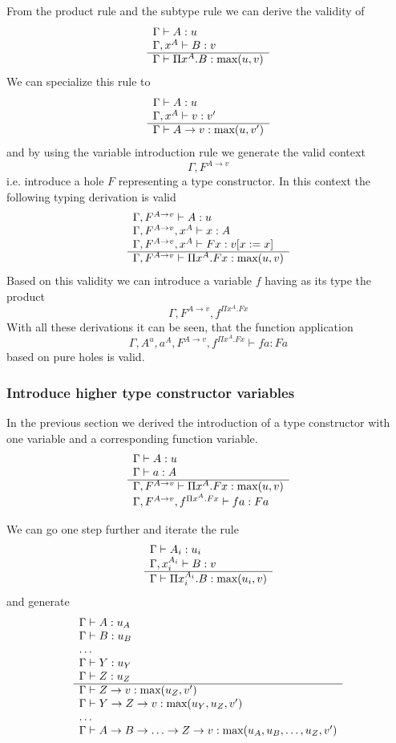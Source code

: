 From the product rule and the subtype rule we can derive the validity of
%
$$
\begin{array}{l} 
    \Gamma \vdash A: u
    \\
    \Gamma, x^A \vdash B: v
 \\ \hline 
    \Gamma \vdash \Pi x^A. B : \text{max}(u, v)
\end{array}
$$
%
We can specialize this rule to
%
$$
\begin{array}{l} 
    \Gamma \vdash A: u
    \\
    \Gamma, x^A \vdash v: v'
 \\ \hline 
    \Gamma \vdash A \to v : \text{max}(u,v')
\end{array}
$$
and by using the variable introduction rule we generate the valid context
%
$$
\Gamma, F^{A \to v}
$$
i.e. introduce a hole $F$ representing a type constructor. In this context the
following typing derivation is valid
%
$$
\begin{array}{l} 
    \Gamma, F^{A \to v} \vdash A : u
    \\
    \Gamma, F^{A \to v}, x^A \vdash x: A
    \\
    \Gamma, F^{A \to v}, x^A \vdash F x: v[x := x]
 \\ \hline 
    \Gamma, F^{A \to v} \vdash \Pi x^A. F x: \text{max}(u, v)
\end{array}
$$
%
Based on this validity we can introduce a variable $f$ having as its type the
product
$$
\Gamma, F^{A \to v}, f^{\Pi x^A. F x}
$$
%
With all these derivations it can be seen, that the function application
$$
\Gamma, A^u, a^A, F^{A \to v}, f^{\Pi x^A. F x} \vdash f a: F a
$$
%
based on pure holes is valid.




\subsubsection{Introduce higher type constructor variables}

In the previous section we derived the introduction of a type constructor with
one variable and a corresponding function variable.
$$
\rulev
{
    \Gamma \vdash A: u
    \\
    \Gamma \vdash a: A

}
{
    \Gamma, F^{A\to v} \vdash \Pi x^A. F x: \max(u,v)
    \\
    \Gamma, F^{A\to v}, f^{\Pi x^A. F x} \vdash f a: F a
}
$$

We can go one step further and iterate the rule
$$
\begin{array}{l} 
    \Gamma \vdash A_i: u_i
    \\
    \Gamma, x_i^{A_i} \vdash B: v
 \\ \hline 
    \Gamma \vdash \Pi x_i^{A_i}. B : \text{max}(u_i, v)
\end{array}
$$
%
and generate
%
$$
\begin{array}{l} 
    \Gamma \vdash A: u_A
    \\
    \Gamma \vdash B: u_B
    \\
    \ldots
    \\
    \Gamma \vdash Y: u_Y
    \\
    \Gamma \vdash Z: u_Z
 \\ \hline 
    \Gamma \vdash Z \to v : \text{max}(u_Z, v')
    \\
    \Gamma \vdash Y \to Z \to v: \text{max}(u_Y, u_Z, v')
    \\
    \ldots
    \\
    \Gamma
    \vdash
    A \to B \to \ldots \to Z \to v:
    \text{max}(u_A, u_B, \ldots, u_Z, v')
\end{array}
$$

